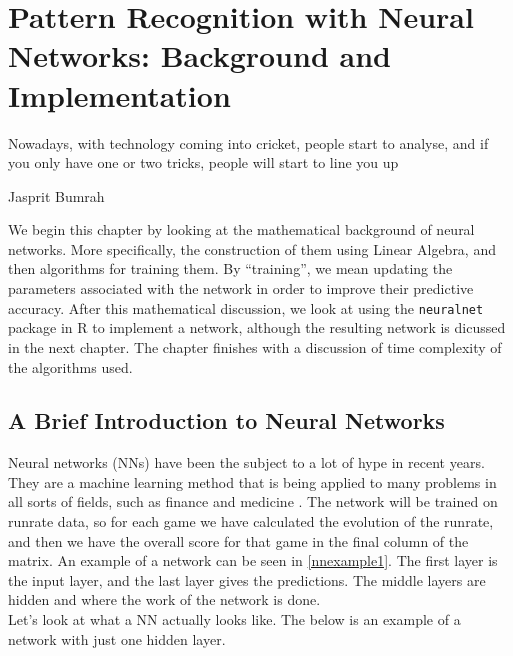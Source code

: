 \chapter{Pattern Recognition with Neural Networks: Background and Implementation}

\epigraph{Nowadays, with technology coming into cricket, people start to analyse, and if you only have one or two tricks, people will start to line you up}{Jasprit Bumrah}

We begin this chapter by looking at the mathematical background of neural networks. More specifically, the construction of them using Linear Algebra, and then algorithms 
for training them. By ``training'', we mean updating the parameters associated with the network in order to improve their predictive accuracy. After this mathematical discussion, 
we look at using the \verb|neuralnet| package in R to implement a network, although the resulting network is dicussed in the next chapter. The chapter finishes with a discussion of 
time complexity of the algorithms used.


\section{A Brief Introduction to Neural Networks}
Neural networks (NNs) have been the subject to a lot of hype in recent years. They are a machine learning method that is being applied to many problems
in all sorts of fields, such as finance \cite{nnstock} and medicine \cite{nncancer}.  
The network will be trained on runrate data, so for each game we have calculated the evolution of the runrate,
and then we have the overall score for that game in the final column of the matrix. An example of a network can be seen in \ref{nnexample1}. The first layer is the 
input layer, and the last layer gives the predictions. The middle layers are hidden and where the work of the network is done. \\

Let's look at what a NN actually looks like. The below is an example of a network with just one hidden layer.

